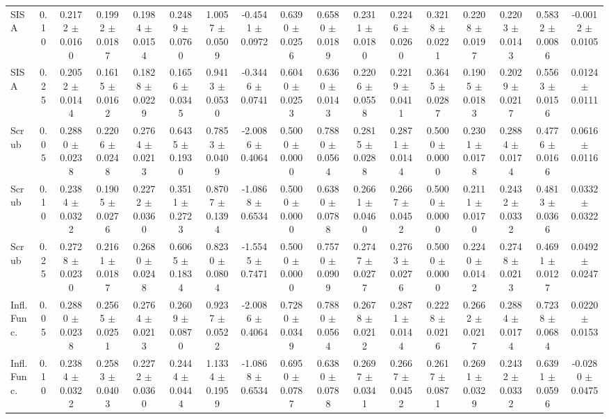 \begin{table}[t]
\begin{tabular}{lcccccccccccccccc}
SISA & 0.10 & 0.2172 $\pm$ 0.0160 & 0.1992 $\pm$ 0.0187 & 0.1984 $\pm$ 0.0154 & 0.2489 $\pm$ 0.0760 & 1.0057 $\pm$ 0.0509 & -0.4541 $\pm$ 0.0972 & 0.6390 $\pm$ 0.0256 & 0.6580 $\pm$ 0.0189 & 0.2311 $\pm$ 0.0180 & 0.2246 $\pm$ 0.0260 & 0.3218 $\pm$ 0.0221 & 0.2208 $\pm$ 0.0197 & 0.2203 $\pm$ 0.0143 & 0.5832 $\pm$ 0.0086 & -0.0012 $\pm$ 0.0105 \\
SISA & 0.25 & 0.2052 $\pm$ 0.0144 & 0.1615 $\pm$ 0.0162 & 0.1828 $\pm$ 0.0229 & 0.1656 $\pm$ 0.0345 & 0.9413 $\pm$ 0.0530 & -0.3446 $\pm$ 0.0741 & 0.6040 $\pm$ 0.0253 & 0.6360 $\pm$ 0.0143 & 0.2206 $\pm$ 0.0558 & 0.2219 $\pm$ 0.0411 & 0.3645 $\pm$ 0.0287 & 0.1905 $\pm$ 0.0183 & 0.2029 $\pm$ 0.0217 & 0.5563 $\pm$ 0.0156 & 0.0124 $\pm$ 0.0111 \\
Scrub & 0.05 & 0.2880 $\pm$ 0.0238 & 0.2206 $\pm$ 0.0248 & 0.2764 $\pm$ 0.0213 & 0.6435 $\pm$ 0.1930 & 0.7853 $\pm$ 0.0409 & -2.0086 $\pm$ 0.4064 & 0.5000 $\pm$ 0.0000 & 0.7880 $\pm$ 0.0564 & 0.2815 $\pm$ 0.0288 & 0.2871 $\pm$ 0.0144 & 0.5000 $\pm$ 0.0000 & 0.2301 $\pm$ 0.0178 & 0.2884 $\pm$ 0.0174 & 0.4776 $\pm$ 0.0166 & 0.0616 $\pm$ 0.0116 \\
Scrub & 0.10 & 0.2384 $\pm$ 0.0322 & 0.1905 $\pm$ 0.0276 & 0.2272 $\pm$ 0.0360 & 0.3511 $\pm$ 0.2723 & 0.8707 $\pm$ 0.1394 & -1.0868 $\pm$ 0.6534 & 0.5000 $\pm$ 0.0000 & 0.6380 $\pm$ 0.0788 & 0.2661 $\pm$ 0.0460 & 0.2667 $\pm$ 0.0452 & 0.5000 $\pm$ 0.0000 & 0.2111 $\pm$ 0.0170 & 0.2432 $\pm$ 0.0332 & 0.4813 $\pm$ 0.0366 & 0.0332 $\pm$ 0.0322 \\
Scrub & 0.25 & 0.2728 $\pm$ 0.0230 & 0.2161 $\pm$ 0.0187 & 0.2680 $\pm$ 0.0248 & 0.6065 $\pm$ 0.1834 & 0.8230 $\pm$ 0.0804 & -1.5545 $\pm$ 0.7471 & 0.5000 $\pm$ 0.0000 & 0.7570 $\pm$ 0.0909 & 0.2747 $\pm$ 0.0277 & 0.2763 $\pm$ 0.0276 & 0.5000 $\pm$ 0.0000 & 0.2240 $\pm$ 0.0142 & 0.2748 $\pm$ 0.0213 & 0.4691 $\pm$ 0.0127 & 0.0492 $\pm$ 0.0247 \\
Infl. Func. & 0.05 & 0.2880 $\pm$ 0.0238 & 0.2565 $\pm$ 0.0251 & 0.2764 $\pm$ 0.0213 & 0.2609 $\pm$ 0.0870 & 0.9237 $\pm$ 0.0522 & -2.0086 $\pm$ 0.4064 & 0.7280 $\pm$ 0.0349 & 0.7880 $\pm$ 0.0564 & 0.2678 $\pm$ 0.0212 & 0.2871 $\pm$ 0.0144 & 0.2228 $\pm$ 0.0216 & 0.2662 $\pm$ 0.0217 & 0.2884 $\pm$ 0.0174 & 0.7238 $\pm$ 0.0684 & 0.0220 $\pm$ 0.0153 \\
Infl. Func. & 0.10 & 0.2384 $\pm$ 0.0322 & 0.2583 $\pm$ 0.0403 & 0.2272 $\pm$ 0.0360 & 0.2444 $\pm$ 0.0444 & 1.1334 $\pm$ 0.1959 & -1.0868 $\pm$ 0.6534 & 0.6950 $\pm$ 0.0787 & 0.6380 $\pm$ 0.0788 & 0.2697 $\pm$ 0.0341 & 0.2667 $\pm$ 0.0452 & 0.2617 $\pm$ 0.0871 & 0.2691 $\pm$ 0.0329 & 0.2432 $\pm$ 0.0332 & 0.6391 $\pm$ 0.0596 & -0.0280 $\pm$ 0.0475 \\

\end{tabular}
\end{table}
